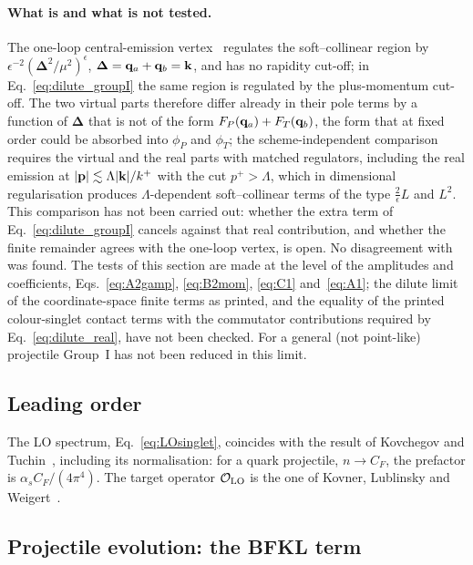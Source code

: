 \paragraph{What is and what is not tested.} The one-loop central-emission vertex~\cite{Fadin:1998py,DelDuca:1998cx,Bartels:2006hg} regulates the soft--collinear region by $\epsilon^{-2}(\boldsymbol\Delta^2/\mu^2)^\epsilon$, $\boldsymbol\Delta=\mathbf{q}_a+\mathbf{q}_b=\mathbf{k}$, and has no rapidity cut-off; in Eq.~\eqref{eq:dilute_groupI} the same region is regulated by the plus-momentum cut-off. The two virtual parts therefore differ already in their pole terms by a function of $\boldsymbol\Delta$ that is not of the form $F_P(\mathbf{q}_a)+F_T(\mathbf{q}_b)$, the form that at fixed order could be absorbed into $\phi_P$ and $\phi_T$; the scheme-independent comparison requires the virtual and the real parts with matched regulators, including the real emission at $|\mathbf{p}|\lesssim\Lambda|\mathbf{k}|/k^+$ with the cut $p^+>\Lambda$, which in dimensional regularisation produces $\Lambda$-dependent soft--collinear terms of the type $\frac2\epsilon L$ and $L^2$. This comparison has not been carried out: whether the extra term of Eq.~\eqref{eq:dilute_groupI} cancels against that real contribution, and whether the finite remainder agrees with the one-loop vertex, is open. No disagreement with~\cite{Fadin:1998py,Bartels:2006hg} was found. The tests of this section are made at the level of the amplitudes and coefficients, Eqs.~\eqref{eq:A2gamp}, \eqref{eq:B2mom}, \eqref{eq:C1} and~\eqref{eq:A1}; the dilute limit of the coordinate-space finite terms as printed, and the equality of the printed colour-singlet contact terms with the commutator contributions required by Eq.~\eqref{eq:dilute_real}, have not been checked. For a general (not point-like) projectile Group~I has not been reduced in this limit.

\subsection{Leading order}

The LO spectrum, Eq.~\eqref{eq:LOsinglet}, coincides with the result of Kovchegov and Tuchin~\cite{Kovchegov:2001sc}, including its normalisation: for a quark projectile, $n\to C_F$, the prefactor is $\alpha_sC_F/(4\pi^4)$. The target operator $\mathcal O_{\rm LO}$ is the one of Kovner, Lublinsky and Weigert~\cite{Kovner:2006wr,Kovner:2006ge}.

\subsection{Projectile evolution: the BFKL term}\label{sec:check_BFKL}

